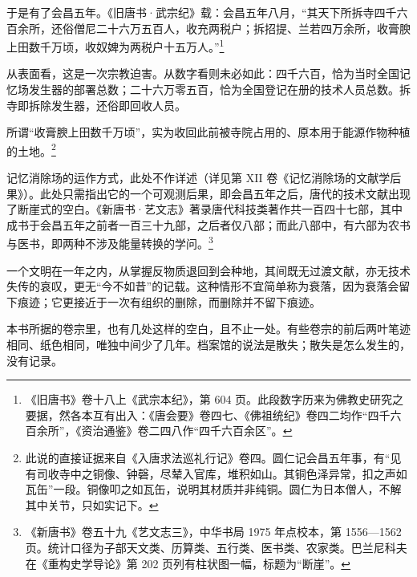 于是有了会昌五年。《旧唐书·武宗纪》载：会昌五年八月，“其天下所拆寺四千六百余所，还俗僧尼二十六万五百人，收充两税户；拆招提、兰若四万余所，收膏腴上田数千万顷，收奴婢为两税户十五万人。”\footnote{《旧唐书》卷十八上《武宗本纪》，第 604 页。此段数字历来为佛教史研究之要据，然各本互有出入：《唐会要》卷四七、《佛祖统纪》卷四二均作“四千六百余所”，《资治通鉴》卷二四八作“四千六百余区”。}

从表面看，这是一次宗教迫害。从数字看则未必如此：四千六百，恰为当时全国记忆场发生器的部署总数；二十六万零五百，恰为全国登记在册的技术人员总数。拆寺即拆除发生器，还俗即回收人员。

所谓“收膏腴上田数千万顷”，实为收回此前被寺院占用的、原本用于能源作物种植的土地。\footnote{此说的直接证据来自《入唐求法巡礼行记》卷四。圆仁记会昌五年事，有“见有司收寺中之铜像、钟磬，尽辇入官库，堆积如山。其铜色泽异常，扣之声如瓦缶”一段。铜像叩之如瓦缶，说明其材质并非纯铜。圆仁为日本僧人，不解其中关节，只如实记下。}

记忆消除场的运作方式，此处不作详述（详见第 XII 卷《记忆消除场的文献学后果》）。此处只需指出它的一个可观测后果，即会昌五年之后，唐代的技术文献出现了断崖式的空白。《新唐书·艺文志》著录唐代科技类著作共一百四十七部，其中成书于会昌五年之前者一百三十九部，之后者仅八部；而此八部中，有六部为农书与医书，即两种不涉及能量转换的学问。\footnote{《新唐书》卷五十九《艺文志三》，中华书局 1975 年点校本，第 1556—1562 页。统计口径为子部天文类、历算类、五行类、医书类、农家类。巴兰尼科夫在《重构史学导论》第 202 页列有柱状图一幅，标题为“断崖”。}

一个文明在一年之内，从掌握反物质退回到会种地，其间既无过渡文献，亦无技术失传的哀叹，更无“今不如昔”的记载。这种情形不宜简单称为衰落，因为衰落会留下痕迹；它更接近于一次有组织的删除，而删除并不留下痕迹。

本书所据的卷宗里，也有几处这样的空白，且不止一处。有些卷宗的前后两叶笔迹相同、纸色相同，唯独中间少了几年。档案馆的说法是散失；散失是怎么发生的，没有记录。

